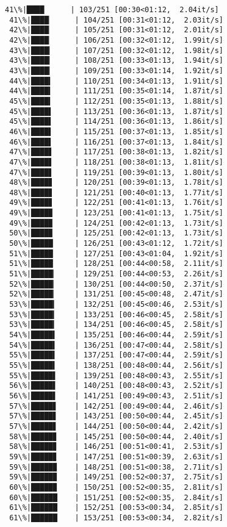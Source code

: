 \documentclass[11pt]{article}
\begin{document}
\begin{Verbatim}[commandchars=\\\{\}]
 41\%|████      | 103/251 [00:30<01:12,  2.04it/s]
 41\%|████▏     | 104/251 [00:31<01:12,  2.03it/s]
 42\%|████▏     | 105/251 [00:31<01:12,  2.01it/s]
 42\%|████▏     | 106/251 [00:32<01:12,  1.99it/s]
 43\%|████▎     | 107/251 [00:32<01:12,  1.98it/s]
 43\%|████▎     | 108/251 [00:33<01:13,  1.94it/s]
 43\%|████▎     | 109/251 [00:33<01:14,  1.92it/s]
 44\%|████▍     | 110/251 [00:34<01:13,  1.91it/s]
 44\%|████▍     | 111/251 [00:35<01:14,  1.87it/s]
 45\%|████▍     | 112/251 [00:35<01:13,  1.88it/s]
 45\%|████▌     | 113/251 [00:36<01:13,  1.87it/s]
 45\%|████▌     | 114/251 [00:36<01:13,  1.86it/s]
 46\%|████▌     | 115/251 [00:37<01:13,  1.85it/s]
 46\%|████▌     | 116/251 [00:37<01:13,  1.84it/s]
 47\%|████▋     | 117/251 [00:38<01:13,  1.82it/s]
 47\%|████▋     | 118/251 [00:38<01:13,  1.81it/s]
 47\%|████▋     | 119/251 [00:39<01:13,  1.80it/s]
 48\%|████▊     | 120/251 [00:39<01:13,  1.78it/s]
 48\%|████▊     | 121/251 [00:40<01:13,  1.77it/s]
 49\%|████▊     | 122/251 [00:41<01:13,  1.76it/s]
 49\%|████▉     | 123/251 [00:41<01:13,  1.75it/s]
 49\%|████▉     | 124/251 [00:42<01:13,  1.73it/s]
 50\%|████▉     | 125/251 [00:42<01:13,  1.73it/s]
 50\%|█████     | 126/251 [00:43<01:12,  1.72it/s]
 51\%|█████     | 127/251 [00:43<01:04,  1.92it/s]
 51\%|█████     | 128/251 [00:44<00:58,  2.11it/s]
 51\%|█████▏    | 129/251 [00:44<00:53,  2.26it/s]
 52\%|█████▏    | 130/251 [00:44<00:50,  2.37it/s]
 52\%|█████▏    | 131/251 [00:45<00:48,  2.47it/s]
 53\%|█████▎    | 132/251 [00:45<00:46,  2.53it/s]
 53\%|█████▎    | 133/251 [00:46<00:45,  2.58it/s]
 53\%|█████▎    | 134/251 [00:46<00:45,  2.58it/s]
 54\%|█████▍    | 135/251 [00:46<00:44,  2.59it/s]
 54\%|█████▍    | 136/251 [00:47<00:44,  2.58it/s]
 55\%|█████▍    | 137/251 [00:47<00:44,  2.59it/s]
 55\%|█████▍    | 138/251 [00:48<00:44,  2.56it/s]
 55\%|█████▌    | 139/251 [00:48<00:43,  2.55it/s]
 56\%|█████▌    | 140/251 [00:48<00:43,  2.52it/s]
 56\%|█████▌    | 141/251 [00:49<00:43,  2.51it/s]
 57\%|█████▋    | 142/251 [00:49<00:44,  2.46it/s]
 57\%|█████▋    | 143/251 [00:50<00:44,  2.45it/s]
 57\%|█████▋    | 144/251 [00:50<00:44,  2.42it/s]
 58\%|█████▊    | 145/251 [00:50<00:44,  2.40it/s]
 58\%|█████▊    | 146/251 [00:51<00:41,  2.53it/s]
 59\%|█████▊    | 147/251 [00:51<00:39,  2.63it/s]
 59\%|█████▉    | 148/251 [00:51<00:38,  2.71it/s]
 59\%|█████▉    | 149/251 [00:52<00:37,  2.75it/s]
 60\%|█████▉    | 150/251 [00:52<00:35,  2.81it/s]
 60\%|██████    | 151/251 [00:52<00:35,  2.84it/s]
 61\%|██████    | 152/251 [00:53<00:34,  2.85it/s]
 61\%|██████    | 153/251 [00:53<00:34,  2.82it/s]

\end{Verbatim}
\end{document}
